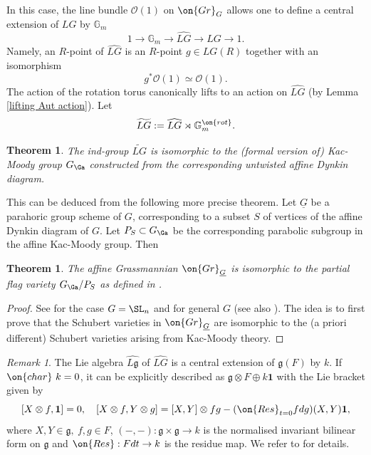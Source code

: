 \documentclass[]{pcmi}
\theoremstyle{plain}
\newtheorem{thm}[equation]{Theorem}
\theoremstyle{remark}
\newtheorem{rmk}[equation]{Remark}
\theoremstyle{definition}
\newcommand{\frakg}{{\mathfrak g}}
\newcommand{\bG}{{\mathbb G}}
\newcommand{\mO}{{\mathcal O}}
\newcommand{\cha}{{\on{char}}}
\newcommand{\Gr}{{\on{Gr}}}
\newcommand{\Res}{{\on{Res}}}
\begin{document}
In this case, the line bundle $\mO(1)$ on $\Gr_G$ allows one to define a central extension of $LG$ by $\bG_m$
\begin{equation}\label{central extension}
1\to\bG_m\to \widehat{LG}\to LG\to 1.
\end{equation}
Namely, an $R$-point of $\widehat{LG}$ is an $R$-point $g\in LG(R)$ together with an isomorphism
\[g^*\mO(1)\simeq \mO(1).\] 
The action of the rotation torus canonically lifts to an action on $\widehat{LG}$ (by Lemma \ref{lifting Aut action}).
Let 
\[\widetilde{LG}:=\widehat{LG}\rtimes\bG_m^{\on{rot}}.\]
\begin{thm}The ind-group $\widetilde{LG}$ is isomorphic to the (formal version of) Kac-Moody group $G_\Ga$ constructed from the corresponding untwisted affine Dynkin diagram.
\end{thm}
This can be deduced from the following more precise theorem. Let $\underline G$ be a parahoric group scheme of $G$, corresponding to a subset $S$ of vertices of the affine Dynkin diagram of $G$. Let $P_S\subset G_\Ga$ be the corresponding parabolic subgroup in the affine Kac-Moody group. Then
\begin{thm}
The affine Grassmannian $\Gr_{\underline G}$ is isomorphic to the partial flag variety $G_\Ga/P_S$ as defined in \cite{Ma,Ku}.
\end{thm}
\begin{proof}See \cite{BL} for the case $G=\SL_n$ and \cite{Fa} for general $G$ (see also \cite[\S 10]{PR}). The idea is to first prove that the Schubert varieties in  $\Gr_{\underline G}$ are isomorphic to the (a priori different) Schubert varieties arising from Kac-Moody theory.
\end{proof}

\begin{rmk}\label{2-cocycle}
The Lie algebra $\widehat{L\frakg}$ of $\widehat{LG}$ is a central extension of $\frakg(F)$ by $k$. If $\cha\ k=0$, it can be explicitly described as $\frakg\otimes F\oplus k\mathbf{1}$ with the Lie bracket given by
\[[X\otimes f,\mathbf{1}]=0,\quad [X\otimes f,Y\otimes g]=[X,Y]\otimes fg- (\Res_{t=0}fdg) (X,Y)\mathbf{1},\]
where $X,Y\in \frakg,\ f,g\in F$, $(-,-): \frakg\times\frakg\to k$ is the normalised invariant bilinear form on $\frakg$ and $\Res: Fdt\to k$ is the residue map. We refer to \cite[\S~7]{Kac} for details. 
\end{rmk}
\end{document}
